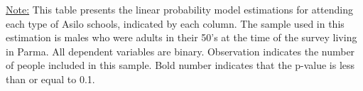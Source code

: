 \begin{footnotesize}
\noindent\underline{Note:} This table presents the linear probability model estimations for attending each type of Asilo schools, indicated by each column. The sample used in this estimation is males who were adults in their 50's at the time of the survey living in Parma. All dependent variables are binary. Observation indicates the number of people included in this sample. Bold number indicates that the p-value is less than or equal to 0.1.
\end{footnotesize}
